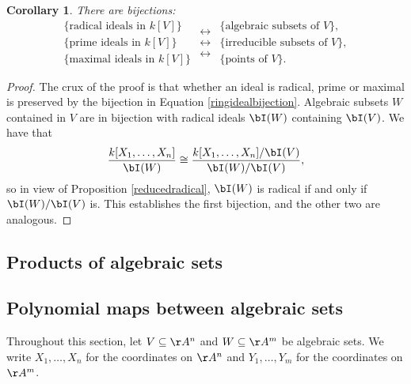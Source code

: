 \documentclass[12pt]{amsart}
\theoremstyle{plain}
\newtheorem{corollary}[theorem]{Corollary}
\begin{document}
\begin{corollary}\label{corollary:coordinateringbijections}
There are bijections:
$$
\begin{array}{c}
\{\text{radical ideals in } k[V] \} \\
\{\text{prime ideals in } k[V] \} \\
\{\text{maximal ideals in } k[V] \} 
\end{array}
\begin{array}{c}
\longleftrightarrow \\
\longleftrightarrow \\
\longleftrightarrow  
\end{array}
\begin{array}{c}
\{\text{algebraic subsets of } V \}, \\
\{\text{irreducible subsets of } V\}, \\
\{\text{points of } V\} .
\end{array}
$$
\end{corollary}
\begin{proof}
The crux of the proof is that whether an ideal is radical, prime or maximal is preserved by the bijection in Equation \ref{ringidealbijection}.
Algebraic subsets $W$ contained in $V$ are in bijection with radical ideals $\bI(W)$ containing $\bI(V)$.
We have that
$$\frac{k[X_1, \ldots, X_n]}{\bI(W)} \cong \frac{k[X_1, \ldots, X_n]/\bI(V)}{\bI(W)/\bI(V)},$$
so in view of Proposition \ref{reducedradical}, $\bI(W)$ is radical if and only if $\bI(W)/\bI(V)$ is.
This establishes the first bijection, and the other two are analogous.
\end{proof}





\subsection{Products of algebraic sets}





\subsection{Polynomial maps between algebraic sets}\label{section:polynomialmaps}
Throughout this section, let $V \subseteq \AA^n$ and $W \subseteq \AA^m$ be algebraic sets.
We write $X_1, \ldots, X_n$ for the coordinates on $\AA^n$ and $Y_1, \ldots, Y_m$ for the coordinates on $\AA^m$.
\end{document}
